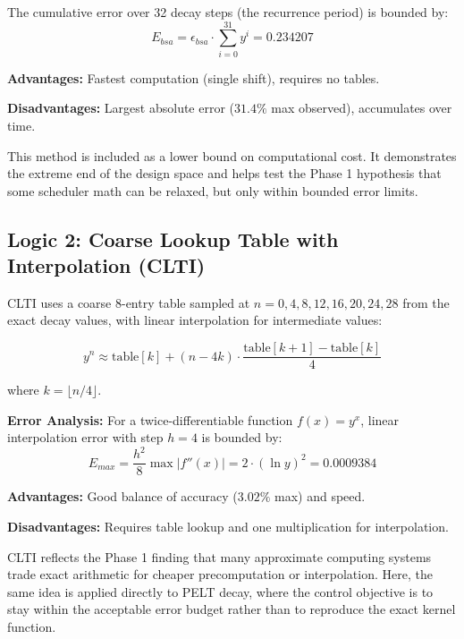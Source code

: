 \documentclass[conference]{IEEEtran}
\begin{document}
The cumulative error over 32 decay steps (the recurrence period) is bounded by:
\begin{equation}
E_{bsa} = \epsilon_{bsa} \cdot \sum_{i=0}^{31} y^i = 0.234207
\label{eq:bsa_cumulative}
\end{equation}

\textbf{Advantages:} Fastest computation (single shift), requires no tables.

\textbf{Disadvantages:} Largest absolute error ($31.4\%$ max observed), accumulates over time.

This method is included as a lower bound on computational cost. It demonstrates the extreme end of the design space and helps test the Phase 1 hypothesis that some scheduler math can be relaxed, but only within bounded error limits.

\subsection{Logic 2: Coarse Lookup Table with Interpolation (CLTI)}

CLTI uses a coarse 8-entry table sampled at $n = 0, 4, 8, 12, 16, 20, 24, 28$ from the exact decay values, with linear interpolation for intermediate values:

\begin{equation}
y^n \approx \text{table}[k] + (n - 4k) \cdot \frac{\text{table}[k+1] - \text{table}[k]}{4}
\label{eq:clti}
\end{equation}

where $k = \lfloor n / 4 \rfloor$.

\textbf{Error Analysis:}
For a twice-differentiable function $f(x) = y^x$, linear interpolation error with step $h = 4$ is bounded by:
\begin{equation}
E_{max} = \frac{h^2}{8} \max |f''(x)| = 2 \cdot (\ln y)^2 = 0.0009384
\label{eq:clti_error}
\end{equation}

\textbf{Advantages:} Good balance of accuracy ($3.02\%$ max) and speed.

\textbf{Disadvantages:} Requires table lookup and one multiplication for interpolation.

CLTI reflects the Phase 1 finding that many approximate computing systems trade exact arithmetic for cheaper precomputation or interpolation. Here, the same idea is applied directly to PELT decay, where the control objective is to stay within the acceptable error budget rather than to reproduce the exact kernel function.
\end{document}
